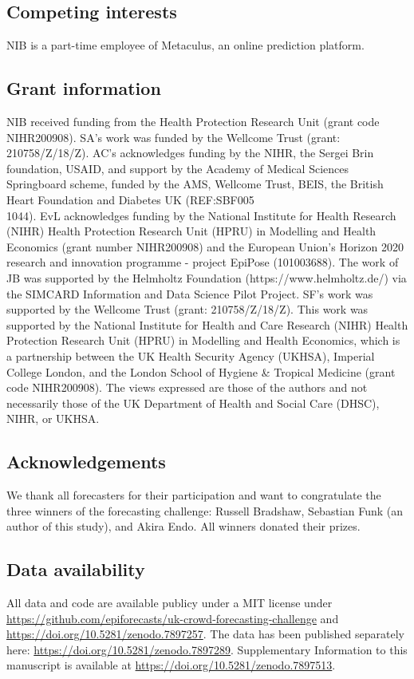 \documentclass[10pt,a4paper,twocolumn]{article}
\begin{document}
\subsection*{Competing interests}
NIB is a part-time employee of Metaculus, an online prediction platform. 

\subsection*{Grant information}
NIB received funding from the Health Protection Research Unit (grant code NIHR200908). SA's work was funded by the Wellcome Trust (grant: 210758/Z/18/Z). AC's acknowledges funding by the NIHR, the Sergei Brin foundation, USAID, and support by the Academy of Medical Sciences Springboard scheme, funded by the AMS, Wellcome Trust, BEIS, the British Heart Foundation and Diabetes UK (REF:SBF005\\1044). EvL acknowledges funding by the National Institute for Health Research (NIHR) Health Protection Research Unit (HPRU) in Modelling and Health Economics (grant number NIHR200908) and the European Union's Horizon 2020 research and innovation programme - project EpiPose (101003688). The work of JB was supported by the Helmholtz Foundation (https://www.helmholtz.de/) via the SIMCARD Information and Data Science Pilot Project. SF's work was supported by the Wellcome Trust (grant: 210758/Z/18/Z). This work was supported by the National Institute for Health and Care Research (NIHR) Health Protection Research Unit (HPRU) in Modelling and Health Economics, which is a partnership between the UK Health Security Agency (UKHSA), Imperial College London, and the London School of Hygiene \& Tropical Medicine (grant code NIHR200908). The views expressed are those of the authors and not necessarily those of the UK Department of Health and Social Care (DHSC), NIHR, or UKHSA.

\subsection*{Acknowledgements}
We thank all forecasters for their participation and want to congratulate the three winners of the forecasting challenge: Russell Bradshaw, Sebastian Funk (an author of this study), and Akira Endo. All winners donated their prizes. 


\subsection*{Data availability}
All data and code are available publicy under a MIT license under \url{https://github.com/epiforecasts/uk-crowd-forecasting-challenge} and \url{https://doi.org/10.5281/zenodo.7897257}. The data has been published separately here: \url{https://doi.org/10.5281/zenodo.7897289}. 
Supplementary Information \cite{bosseSupplementaryInformationHuman2023} to this manuscript is available at \url{https://doi.org/10.5281/zenodo.7897513}. 
\end{document}
